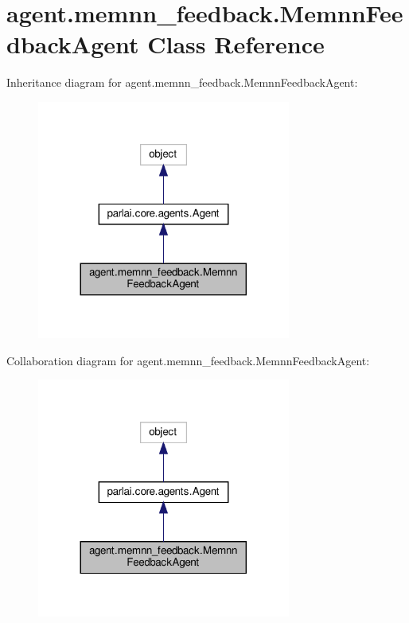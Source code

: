 \hypertarget{classagent_1_1memnn__feedback_1_1MemnnFeedbackAgent}{}\section{agent.\+memnn\+\_\+feedback.\+Memnn\+Feedback\+Agent Class Reference}
\label{classagent_1_1memnn__feedback_1_1MemnnFeedbackAgent}


Inheritance diagram for agent.\+memnn\+\_\+feedback.\+Memnn\+Feedback\+Agent\+:
\nopagebreak
\begin{figure}[H]
\begin{center}
\leavevmode
\includegraphics[width=236pt]{classagent_1_1memnn__feedback_1_1MemnnFeedbackAgent__inherit__graph}
\end{center}
\end{figure}


Collaboration diagram for agent.\+memnn\+\_\+feedback.\+Memnn\+Feedback\+Agent\+:
\nopagebreak
\begin{figure}[H]
\begin{center}
\leavevmode
\includegraphics[width=236pt]{classagent_1_1memnn__feedback_1_1MemnnFeedbackAgent__coll__graph}
\end{center}
\end{figure}
